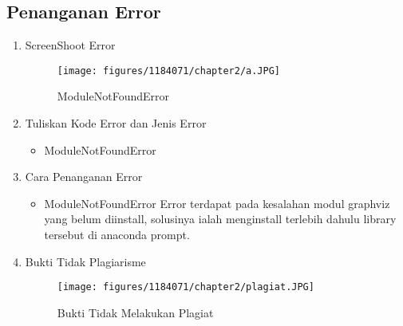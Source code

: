 \newpage\subsection{Penanganan Error}
\begin{enumerate}
	\item ScreenShoot Error
	\begin{figure}[h]
		\texttt{[image: figures/1184071/chapter2/a.JPG]}
		\centering
		\caption{ModuleNotFoundError}
	\end{figure}
	\item Tuliskan Kode Error dan Jenis Error
	\begin{itemize}
	
		\item ModuleNotFoundError
	\end{itemize}
	\item Cara Penanganan Error
	\begin{itemize}
		\item ModuleNotFoundError
		\hfill\break
		Error terdapat pada kesalahan modul graphviz yang belum diinstall, solusinya ialah menginstall terlebih dahulu library tersebut di anaconda prompt.
	\end{itemize}
	\item Bukti Tidak Plagiarisme
	\begin{figure}[h]
		\texttt{[image: figures/1184071/chapter2/plagiat.JPG]}
		\centering
		\caption{Bukti Tidak Melakukan Plagiat}
	\end{figure}
\end{enumerate}